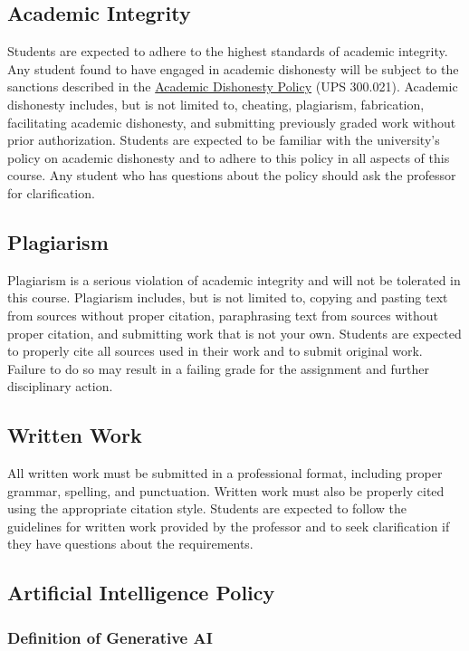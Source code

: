 \documentclass[12pt, letterpaper]{article}
\begin{document}
\subsection*{Academic Integrity}
Students are expected to adhere to the highest standards of academic integrity. Any student found to have engaged in academic dishonesty will be subject to the sanctions described in the \href{https://www.fullerton.edu/senate/publications_policies_resolutions/ups/UPS%20300/UPS%20300.021.pdf}{Academic Dishonesty Policy} (UPS 300.021). Academic dishonesty includes, but is not limited to, cheating, plagiarism, fabrication, facilitating academic dishonesty, and submitting previously graded work without prior authorization. Students are expected to be familiar with the university's policy on academic dishonesty and to adhere to this policy in all aspects of this course. Any student who has questions about the policy should ask the professor for clarification.

\subsection*{Plagiarism}
Plagiarism is a serious violation of academic integrity and will not be tolerated in this course. Plagiarism includes, but is not limited to, copying and pasting text from sources without proper citation, paraphrasing text from sources without proper citation, and submitting work that is not your own. Students are expected to properly cite all sources used in their work and to submit original work. Failure to do so may result in a failing grade for the assignment and further disciplinary action.

\subsection*{Written Work}
All written work must be submitted in a professional format, including proper grammar, spelling, and punctuation. Written work must also be properly cited using the appropriate citation style. Students are expected to follow the guidelines for written work provided by the professor and to seek clarification if they have questions about the requirements.
\subsection*{Artificial Intelligence Policy}

\subsubsection*{Definition of Generative AI}
\end{document}
